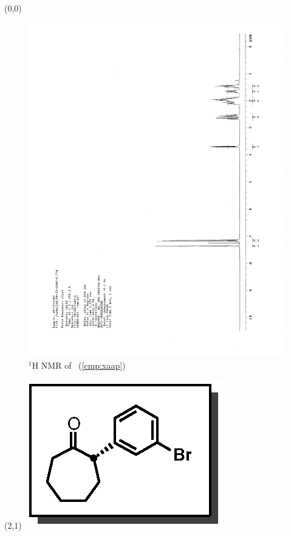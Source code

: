 \begin{textblock}{20}(0,0)
\begin{figure}[htb]
\caption{$^1$H NMR of \CMPxaap\ (\ref{cmp:xaap})}
\includegraphics[scale=0.75, trim = 0mm 0mm 0mm 5mm,
clip]{chp_asymmetric/images/nmr/xaapH}
\vspace{-100pt}
\end{figure}
\end{textblock}
\begin{textblock}{1}(2,1)
\includegraphics[scale=0.8, angle=90]{chp_asymmetric/images/xaap}
\end{textblock}
